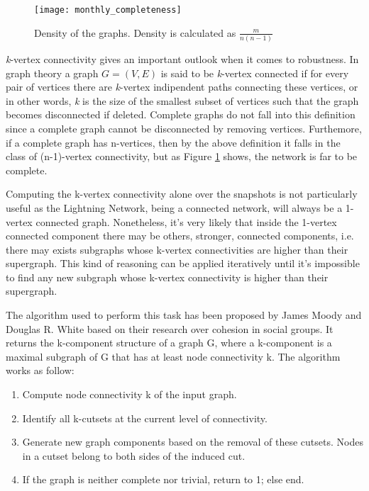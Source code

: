 	\begin{figure}
		\centering
		\texttt{[image: monthly\_completeness]}
		\caption{Density of the graphs. Density is calculated as $\frac{m}{n(n-1)}$}
		\label{monthly_completeness}
	\end{figure}
	
	\textit{k}-vertex connectivity gives an important outlook when it comes to robustness. In graph theory a graph $G = (V,E)$ is said to be \textit{k}-vertex connected if for every pair of vertices there are \textit{k}-vertex indipendent paths connecting these vertices, or in other words, \textit{k} is the size of the smallest subset of vertices such that the graph becomes disconnected if deleted. Complete graphs do not fall into this definition since a complete graph cannot be disconnected by removing vertices. Furthemore, if a complete graph has n-vertices, then by the above definition it falls in the class of (n-1)-vertex connectivity, but as Figure \ref{monthly_completeness} shows, the network is far to be complete.

	Computing the k-vertex connectivity alone over the snapshots is not particularly useful as the Lightning Network, being a connected network, will always be a 1-vertex connected graph. Nonetheless, it's very likely that inside the 1-vertex connected component there may be others, stronger, connected components, i.e. there may exists subgraphs whose k-vertex connectivities are higher than their supergraph. This kind of reasoning can be applied iteratively until it's impossible to find any new subgraph whose k-vertex connectivity is higher than their supergraph.
	
	The algorithm used to perform this task has been proposed by James Moody and Douglas R. White \cite{Moody2003} based on their research over cohesion in social groups. It returns the k-component structure of a graph G, where a k-component is a maximal subgraph of G that has at least node connectivity k. The algorithm works as follow:
	\begin{enumerate}
		\item Compute node connectivity k of the input graph.
		\item Identify all k-cutsets at the current level of connectivity. 
		\item Generate new graph components based on the removal of these cutsets. Nodes in a cutset belong to both sides of the induced cut.
		\item If the graph is neither complete nor trivial, return to 1; else end.
	\end{enumerate}
	
